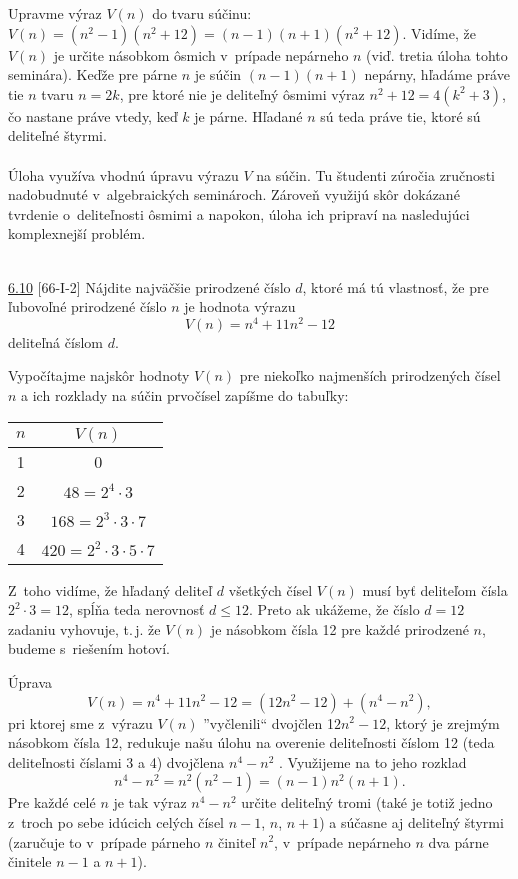 \rieh Upravme výraz $V(n)$ do tvaru súčinu: $V (n) = (n^2-1)(n^2+12)=(n-1)(n+1)(n^2+12)$. Vidíme, že $V(n)$ je určite násobkom ôsmich v~prípade nepárneho $n$ (viď. tretia úloha tohto seminára). Keďže pre párne $n$ je súčin $(n-1)(n+1)$ nepárny, hľadáme práve tie $n$ tvaru $n = 2k$, pre ktoré nie je deliteľný ôsmimi výraz $n^2+ 12 = 4(k^2+ 3)$, čo nastane práve vtedy, keď $k$ je párne. Hľadané $n$ sú teda práve tie, ktoré sú deliteľné štyrmi.\\
\\
\kom Úloha využíva vhodnú úpravu výrazu $V$ na súčin. Tu študenti zúročia zručnosti nadobudnuté v~algebraických seminároch. Zároveň využijú skôr dokázané tvrdenie o~deliteľnosti ôsmimi a napokon, úloha ich pripraví na nasledujúci komplexnejší problém.\\
\\
\begin{tcolorbox}[breakable,notitle,boxrule=0pt,colback=light-gray,colframe=light-gray]\ul{6.10} [66-I-2]
Nájdite najväčšie prirodzené číslo $d$, ktoré má tú vlastnosť, že pre ľubovoľné prirodzené číslo $n$ je hodnota výrazu $$V (n) = n^4+ 11n^2-12$$
deliteľná číslom $d$.

\end{tcolorbox}

\rieh Vypočítajme najskôr hodnoty $V (n)$ pre niekoľko najmenších prirodzených čísel $n$ a ich rozklady na súčin prvočísel zapíšme do tabuľky:
\begin{center}
\begin{tabular}{c c}
$n$ & $V (n) $\\
\hline
1 & 0\\
2 & $48 = 2^4 \cdot 3$\\
3 & $168 = 2^3 \cdot 3 \cdot 7$\\
4 & $420 = 2^2 \cdot 3 \cdot 5 \cdot 7$
\end{tabular}
\end{center}
Z~toho vidíme, že hľadaný deliteľ $d$ všetkých čísel $V (n)$ musí byť deliteľom čísla $2^2 \cdot 3 = 12$, spĺňa teda nerovnosť $d \leq 12$. Preto ak ukážeme, že číslo $d = 12$ zadaniu vyhovuje,  t.\,j. že $V (n)$ je násobkom čísla 12 pre každé prirodzené $n$, budeme s~riešením hotoví.

Úprava $$V (n) = n^4+ 11n^2 - 12 = (12n^2 - 12) + (n^4 - n^2),$$ pri ktorej sme z~výrazu $V (n)$ ”vyčlenili“ dvojčlen 1$2n^2 -12$, ktorý je zrejmým násobkom čísla 12, redukuje našu úlohu na overenie deliteľnosti číslom 12 (teda deliteľnosti číslami 3 a 4) dvojčlena $n^4 - n^2$ . Využijeme na to jeho rozklad $$n^4 - n^2 = n^2(n^2 - 1) = (n - 1)n^2(n + 1).$$
Pre každé celé $n$ je tak výraz $n^4 - n^2$ určite deliteľný tromi (také je totiž jedno z~troch
po sebe idúcich celých čísel $n - 1$, $n$, $n + 1$) a súčasne aj deliteľný štyrmi (zaručuje to
v~prípade párneho $n$ činiteľ $n^2$, v~prípade nepárneho $n$ dva párne činitele $n-1$ a $n+1$).

